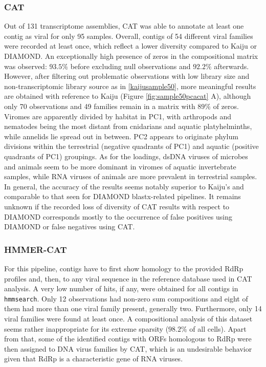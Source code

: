 \documentclass[
  openany]{book}
\begin{document}
\hypertarget{cat}{%
\subsubsection{CAT}\label{cat}}

Out of 131 transcriptome assemblies, CAT was able to annotate at least one contig as viral for only 95 samples. Overall, contigs of 54 different viral families were recorded at least once, which reflect a lower diversity compared to Kaiju or DIAMOND. An exceptionally high presence of zeros in the compositional matrix was observed: \(93.5\%\) before excluding null observations and \(92.2\%\) afterwards. However, after filtering out problematic observations with low library size and non-transcriptomic library source as in \ref{kaijusample50}, more meaningful results are obtained with reference to Kaiju (Figure \ref{fig:sample50pcacat} A), although only 70 observations and 49 families remain in a matrix with \(89\%\) of zeros. Viromes are apparently divided by habitat in PC1, with arthropods and nematodes being the most distant from cnidarians and aquatic platyhelminths, while annelids lie spread out in between. PC2 appears to originate phylum divisions within the terrestrial (negative quadrants of PC1) and aquatic (positive quadrants of PC1) groupings. As for the loadings, dsDNA viruses of microbes and animals seem to be more dominant in viromes of aquatic invertebrate samples, while RNA viruses of animals are more prevalent in terrestrial samples. In general, the accuracy of the results seems notably superior to Kaiju's and comparable to that seen for DIAMOND blastx-related pipelines. It remains unknown if the recorded loss of diversity of CAT results with respect to DIAMOND corresponds mostly to the occurrence of false positives using DIAMOND or false negatives using CAT.

\hypertarget{hmmer-cat}{%
\subsubsection{HMMER-CAT}\label{hmmer-cat}}

For this pipeline, contigs have to first show homology to the provided RdRp profiles and, then, to any viral sequence in the reference database used in CAT analysis. A very low number of hits, if any, were obtained for all contigs in \texttt{hmmsearch}. Only 12 observations had non-zero sum compositions and eight of them had more than one viral family present, generally two. Furthermore, only 14 viral families were found at least once. A compositional analysis of this dataset seems rather inappropriate for its extreme sparsity (\(98.2\%\) of all cells). Apart from that, some of the identified contigs with ORFs homologous to RdRp were then assigned to DNA virus families by CAT, which is an undesirable behavior given that RdRp is a characteristic gene of RNA viruses.
\end{document}
